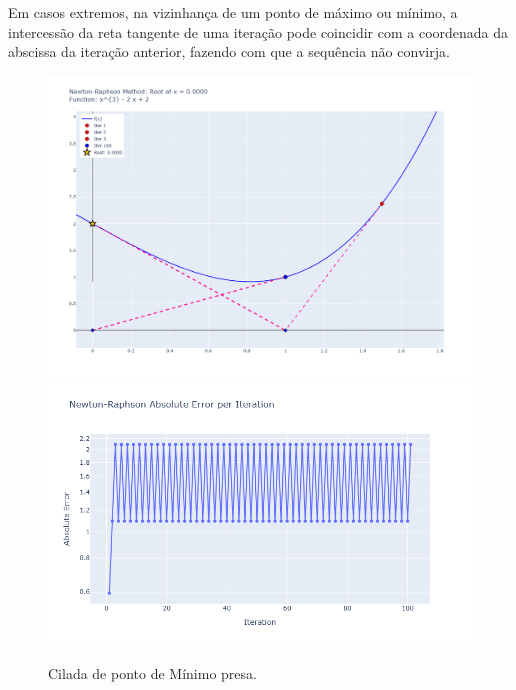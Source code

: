 Em casos extremos, na vizinhança de um ponto de máximo ou mínimo, a intercessão da reta tangente de uma iteração pode coincidir com a coordenada da abscissa da iteração anterior, fazendo com que a sequência não convirja.
\begin{figure}[H]
    \centering 
    \includegraphics[width=1\textwidth]{Imagens/pitfalls/03/x3_2x_2_10.png}
    \includegraphics[width=1\textwidth]{Imagens/pitfalls/03/err_x3_2x_2_10.png}
    \caption{Cilada de ponto de Mínimo presa.}
    \label{fig:ciladaMinMax_B}
\end{figure}

